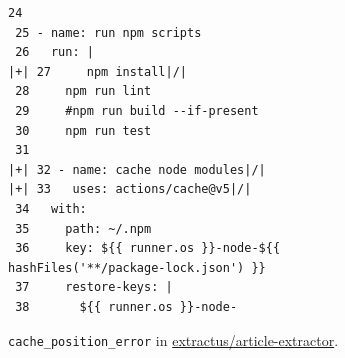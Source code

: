 \begin{figure}[!htbp]
\centering
\begin{lstlisting}[style=ccscase]
 24 
 25 - name: run npm scripts
 26   run: |
|+| 27     npm install|/|
 28     npm run lint
 29     #npm run build --if-present
 30     npm run test
 31 
|+| 32 - name: cache node modules|/|
|+| 33   uses: actions/cache@v5|/|
 34   with:
 35     path: ~/.npm
 36     key: ${{ runner.os }}-node-${{ hashFiles('**/package-lock.json') }}
 37     restore-keys: |
 38       ${{ runner.os }}-node-
\end{lstlisting}
\caption{\texttt{cache\_position\_error} in \href{https://github.com/extractus/article-extractor/blob/c94926a53c87e15730a72bd56d04daba2e1fd47d/.github/workflows/ci-test.yml}{extractus/article-extractor}.}
\label{fig:ccs-position-error}
\end{figure}
